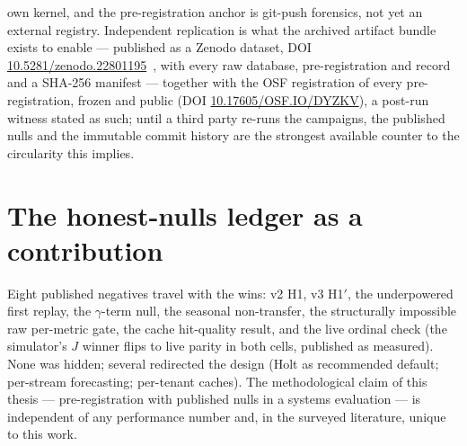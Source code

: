 \begin{itemize}
        own kernel, and the pre-registration anchor is git-push forensics, not
        yet an external registry. Independent replication is what the archived
        artifact bundle exists to enable --- published as a Zenodo dataset,
        DOI \href{https://doi.org/10.5281/zenodo.22801195}{10.5281/zenodo.22801195}~\citep{polyforge2026zenodo},
        with every raw database, pre-registration and record and a SHA-256
        manifest --- together with the OSF registration of every
        pre-registration, frozen and public (DOI
        \href{https://doi.org/10.17605/OSF.IO/DYZKV}{10.17605/OSF.IO/DYZKV}), a post-run witness
        stated as such; until a third party re-runs the
        campaigns, the published nulls and the immutable commit history are the
        strongest available counter to the circularity this implies.
\end{itemize}

\section{The honest-nulls ledger as a contribution}

Eight published negatives travel with the wins: v2 H1, v3 H1$'$, the
underpowered first replay, the $\gamma$-term null, the seasonal
non-transfer, the structurally impossible raw per-metric gate, the cache
hit-quality result, and the live ordinal check (the simulator's $J$ winner
flips to live parity in both cells, published as measured). None was hidden;
several redirected the design (Holt as
recommended default; per-stream forecasting; per-tenant caches). The
methodological claim of this thesis --- pre-registration with published
nulls in a systems evaluation --- is independent of any performance number
and, in the surveyed literature, unique to this work.
